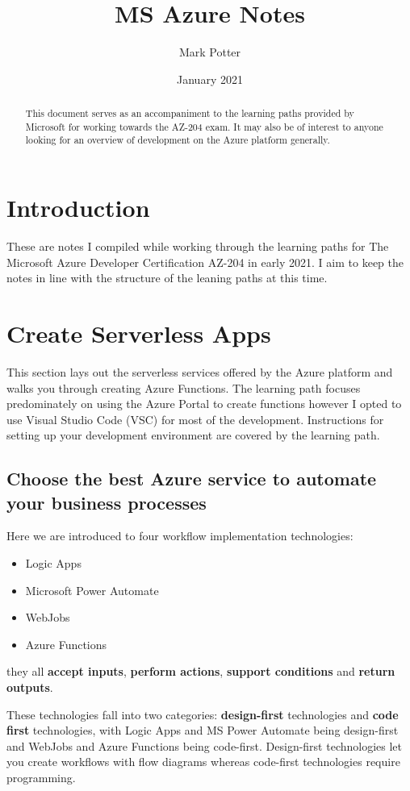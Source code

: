 \documentclass{article}
\title{MS Azure Notes}
\author{Mark Potter}
\date{January 2021}
\begin{document}
\maketitle

\begin{abstract}
This document serves as an accompaniment to the learning paths provided by Microsoft for working towards the AZ-204 exam. It may also be of interest to anyone looking for an overview of development on the Azure platform generally.
\end{abstract}

\section{Introduction}
These are notes I compiled while working through the learning paths for The Microsoft Azure Developer Certification AZ-204 in early 2021. I aim to keep the notes in line with the structure of the leaning paths at this time. 

\section{Create Serverless Apps}

This section lays out the serverless services offered by the Azure platform and walks you through creating Azure Functions. The learning path focuses predominately on using the Azure Portal to create functions however I opted to use Visual Studio Code (VSC) for most of the development. Instructions for setting up your development environment are covered by the learning path.

\subsection{Choose the best Azure service to automate your business processes}
Here we are introduced to four workflow implementation technologies:
\begin{itemize}
    \item Logic Apps
    \item Microsoft Power Automate
    \item WebJobs
    \item Azure Functions
\end{itemize}

they all \textbf{accept inputs}, \textbf{perform actions}, \textbf{support conditions} and \textbf{return outputs}.

These technologies fall into two categories: \textbf{design-first} technologies and \textbf{code first} technologies, with Logic Apps and MS Power Automate being design-first and WebJobs and Azure Functions being code-first. Design-first technologies let you create workflows with flow diagrams whereas code-first technologies require programming. 
\end{document}
